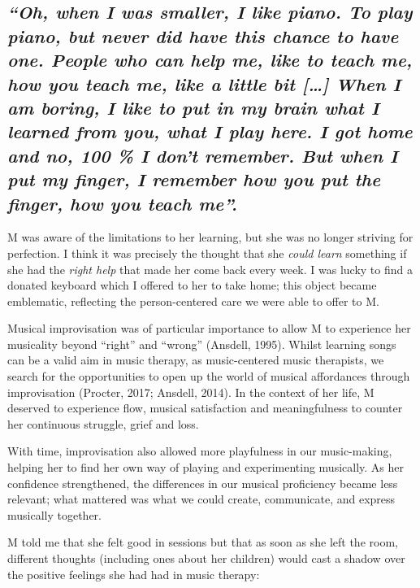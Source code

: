 \documentclass[authordate, empirical]{jote-new-article}
\begin{document}
	\subsection{\emph{“Oh, when I was smaller, I like piano. To play piano, but never did have this chance to have one. People who can help me, like to teach me, how you teach me, like a little bit […] When I am boring, I like to put in my brain what I learned from you, what I play here. I got home and no, 100 \% I don't remember. But when I put my finger, I remember how you put the finger, how you teach me”.}}







	M was aware of the limitations to her learning, but she was no longer striving for perfection. I think it was precisely the thought that she \emph{could learn }something if she had the \emph{right help} that made her come back every week. I was lucky to find a donated keyboard which I offered to her to take home; this object became emblematic, reflecting the person-centered care we were able to offer to M.







	Musical improvisation was of particular importance to allow M to experience her musicality beyond “right” and “wrong” (Ansdell, 1995). Whilst learning songs can be a valid aim in music therapy, as music-centered music therapists, we search for the opportunities to open up the world of musical affordances through improvisation (Procter, 2017; Ansdell, 2014). In the context of her life, M deserved to experience flow, musical satisfaction and meaningfulness to counter her continuous struggle, grief and loss.







	With time, improvisation also allowed more playfulness in our music-making, helping her to find her own way of playing and experimenting musically. As her confidence strengthened, the differences in our musical proficiency became less relevant; what mattered was what we could create, communicate, and express musically together.







	M told me that she felt good in sessions but that as soon as she left the room, different thoughts (including ones about her children) would cast a shadow over the positive feelings she had had in music therapy:
\end{document}
